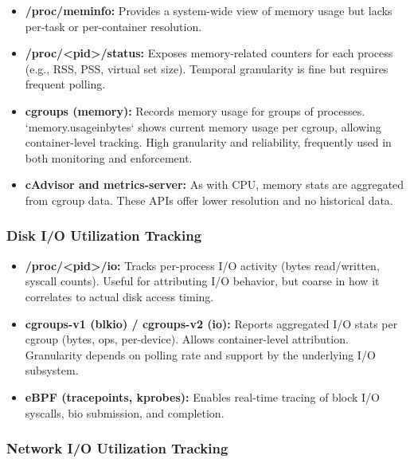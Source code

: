 \begin{itemize}
    \item \textbf{/proc/meminfo:} Provides a system-wide view of memory usage but lacks per-task or per-container resolution.
    \item \textbf{/proc/\textless pid\textgreater/status:} Exposes memory-related counters for each process (e.g., RSS, PSS, virtual set size). Temporal granularity is fine but requires frequent polling.
    \item \textbf{cgroups (memory):} Records memory usage for groups of processes. `memory.usage\textunderscore in\textunderscore bytes` shows current memory usage per cgroup, allowing container-level tracking. High granularity and reliability, frequently used in both monitoring and enforcement.
    \item \textbf{cAdvisor and metrics-server:} As with CPU, memory stats are aggregated from cgroup data. These APIs offer lower resolution and no historical data.
\end{itemize}

\subsubsection{Disk I/O Utilization Tracking}

\begin{itemize}
    \item \textbf{/proc/\textless pid\textgreater/io:} Tracks per-process I/O activity (bytes read/written, syscall counts). Useful for attributing I/O behavior, but coarse in how it correlates to actual disk access timing.
    \item \textbf{cgroups-v1 (blkio) / cgroups-v2 (io):} Reports aggregated I/O stats per cgroup (bytes, ops, per-device). Allows container-level attribution. Granularity depends on polling rate and support by the underlying I/O subsystem.
    \item \textbf{eBPF (tracepoints, kprobes):} Enables real-time tracing of block I/O syscalls, bio submission, and completion.
\end{itemize}

\subsubsection{Network I/O Utilization Tracking}

